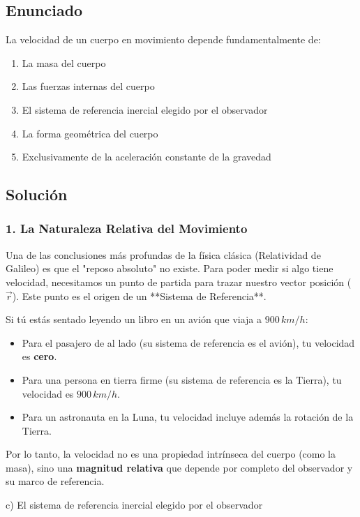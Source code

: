 \documentclass[12pt, a4paper]{article}
\begin{document}
\newpage

\subsection*{Enunciado}
La velocidad de un cuerpo en movimiento depende fundamentalmente de:
\begin{enumerate}[label=\alph*)]
    \item La masa del cuerpo
    \item Las fuerzas internas del cuerpo
    \item El sistema de referencia inercial elegido por el observador
    \item La forma geométrica del cuerpo
    \item Exclusivamente de la aceleración constante de la gravedad
\end{enumerate}

\subsection*{Solución}

\subsubsection*{1. La Naturaleza Relativa del Movimiento}
Una de las conclusiones más profundas de la física clásica (Relatividad de Galileo) es que el "reposo absoluto" no existe. 
Para poder medir si algo tiene velocidad, necesitamos un punto de partida para trazar nuestro vector posición ($\vec{r}$). Este punto es el origen de un **Sistema de Referencia**.

Si tú estás sentado leyendo un libro en un avión que viaja a $900\,\si{km/h}$:
\begin{itemize}
    \item Para el pasajero de al lado (su sistema de referencia es el avión), tu velocidad es \textbf{cero}.
    \item Para una persona en tierra firme (su sistema de referencia es la Tierra), tu velocidad es \textbf{$900\,\si{km/h}$}.
    \item Para un astronauta en la Luna, tu velocidad incluye además la rotación de la Tierra.
\end{itemize}
Por lo tanto, la velocidad no es una propiedad intrínseca del cuerpo (como la masa), sino una \textbf{magnitud relativa} que depende por completo del observador y su marco de referencia.

\begin{tcolorbox}[colback=green!5!white, colframe=green!50!black, title=Respuesta Final]
\centering \Large c) El sistema de referencia inercial elegido por el observador
\end{tcolorbox}
\end{document}
